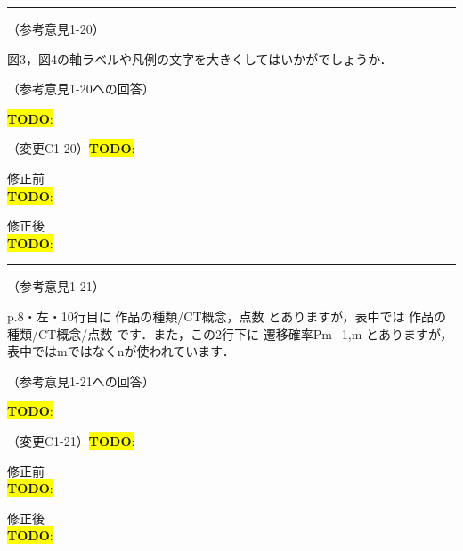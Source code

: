 \documentclass{jarticle} %
\newcommand{\todo}[1]{\colorbox{yellow}{{\bf TODO}:}{\color{blue}{\textbf{[#1]}}}}
\def\subsection#1{ \vspace{1pc} {\gt #1} }
\def\nextans{ \vspace{2pc} \hrule }
\begin{document}
\newpage
\nextans
\subsection{（参考意見1-20）}

図3，図4の軸ラベルや凡例の文字を大きくしてはいかがでしょうか．

\subsection{（参考意見1-20への回答）}

\todo{hoge}

\subsection{（変更C1-20）\todo{hoge}}
\vspace{-0.3cm}
\begin{description}
\item 修正前\\
\phantom{　}
\todo{hoge}
\vspace{-0.3cm}
\item 修正後\\
\phantom{　}
\todo{hoge}
\end{description}

\newpage
\nextans
\subsection{（参考意見1-21）}

p.8・左・10行目に { 作品の種類/CT概念，点数 } とありますが，表中では { 作品の種類/CT概念/点数 } です．また，この2行下に { 遷移確率Pm−1,m } とありますが，表中ではmではなくnが使われています．

\subsection{（参考意見1-21への回答）}

\todo{hoge}

\subsection{（変更C1-21）\todo{hoge}}
\vspace{-0.3cm}
\begin{description}
\item 修正前\\
\phantom{　}
\todo{hoge}
\vspace{-0.3cm}
\item 修正後\\
\phantom{　}
\todo{hoge}
\end{description}
\end{document}
